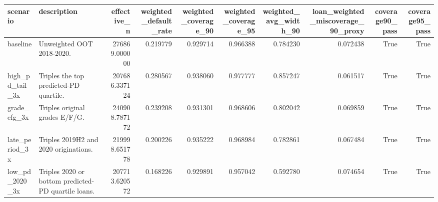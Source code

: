 \begin{tabular}{llrrrrrrrr}
\toprule
scenario & description & effective\_n & weighted\_default\_rate & weighted\_coverage\_90 & weighted\_coverage\_95 & weighted\_avg\_width\_90 & loan\_weighted\_miscoverage\_90\_proxy & coverage90\_pass & coverage95\_pass \\
\midrule
baseline & Unweighted OOT 2018-2020. & 276869.000000 & 0.219779 & 0.929714 & 0.966388 & 0.784230 & 0.072438 & True & True \\
high\_pd\_tail\_3x & Triples the top predicted-PD quartile. & 207686.337124 & 0.280567 & 0.938060 & 0.977777 & 0.857247 & 0.061517 & True & True \\
grade\_efg\_3x & Triples original grades E/F/G. & 240908.787172 & 0.239208 & 0.931301 & 0.968606 & 0.802042 & 0.069859 & True & True \\
late\_period\_3x & Triples 2019H2 and 2020 originations. & 219998.651778 & 0.200226 & 0.935222 & 0.968984 & 0.782861 & 0.067484 & True & True \\
low\_pd\_2020\_3x & Triples 2020 or bottom predicted-PD quartile loans. & 207713.620572 & 0.168226 & 0.929891 & 0.957042 & 0.592780 & 0.074654 & True & True \\
\bottomrule
\end{tabular}
